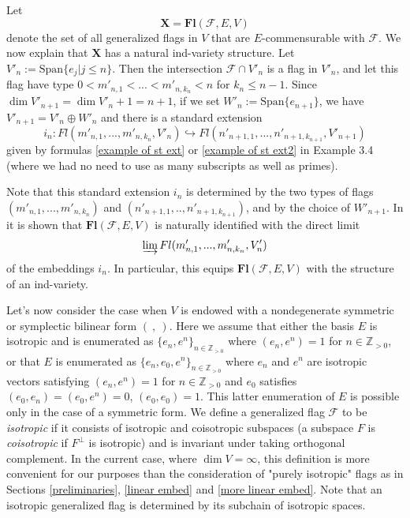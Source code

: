 \documentclass[12pt]{amsart}
\theoremstyle{definition}
\begin{document}
Let 
\begin{equation*}\label{X=F(...)}
\mathbf{X}=\mathbf{Fl}(\mathcal{F},E,V)
\end{equation*}
denote the set of all generalized flags in $V$ that are
$E$-commensurable 
with $\mathcal{F}$. We now explain that $\mathbf{X}$ 
has a natural ind-variety structure. Let $V'_n:=\mathrm{Span}
\{e_j|j\le n\}$. Then the intersection $\mathcal{F}\cap V'_n$ 
is a flag in $V'_n$, and let this flag have type $0<m'_{n,1}
<...<m'_{n,k_n}<n$ for $k_n\le n-1$. Since $\dim V'_{n+1}=\dim 
V'_n+1=n+1$, if we set $W'_n:=\mathrm{Span}\{e_{n+1}\}$,
we have $V'_{n+1}=V'_n\oplus W'_n$ and there is a standard
extension $$i_n:Fl(m'_{n,1},...,m'_{n,k_n},V'_n)\hookrightarrow
Fl(n'_{n+1,1},...,n'_{n+1,k_{n+1}},V'_{n+1})$$ given by 
formulas \eqref{example of st ext} or \eqref{example of st 
ext2} in Example 3.4 (where we had no need to use as many    
subscripts as well as primes).

Note that this standard extension $i_n$ is determined by the 
two types of flags $(m'_{n,1},...,m'_{n,k_n})$ and 
$(n'_{n+1,1},..,n'_{n+1,k_{n+1}})$, and by the choice of 
$W'_{n+1}$. In \cite{DP} it is shown that $\mathbf{Fl}(\mathcal{F},E,V)$ is 
naturally identified with the direct limit 
$$
\varinjlim Fl(m'_{n,1},...,m'_{n,k_n},V'_n)
$$ 
of the embeddings $i_n$. In particular, this equips 
$\mathbf{Fl}(\mathcal{F},E,V)$ with the structure of an 
ind-variety.

Let's now consider the case when $V$ is endowed with a 
nondegenerate symmetric or symplectic bilinear form $(\ ,\ )$. 
Here we assume that either the basis $E$ is isotropic and is 
enumerated as $\{e_n,e^n\}_{n\in\mathbb{Z}_{>0}}$ where 
$(e_n,e^n)=1$ for $n\in\mathbb{Z}_{>0}$, or that $E$ is 
enumerated as $\{e_n,e_0,e^n\}_{n\in\mathbb{Z}_{>0}}$ where 
$e_n$ and $e^n$ are isotropic vectors 
satisfying $(e_n,e^n)=1$ for $n\in\mathbb{Z}_{>0}$ and $e_0$
satisfies $(e_0,e_n)=(e_0,e^n)=0$, $(e_0,e_0)=1$. This latter
enumeration of $E$ is possible only in the case of a symmetric 
form. We define a generalized flag $\mathcal{F}$ to be 
\textit{isotropic} if it consists of isotropic and coisotropic 
subspaces (a subspace $F$ is \textit{coisotropic} if 
$F^{\bot}$ is isotropic) and is invariant under taking 
orthogonal complement. In the current case, where $\dim 
V=\infty$, this definition is more convenient for our purposes
than the consideration of "purely isotropic" flags as in 
Sections \ref{preliminaries}, \ref{linear embed} and \ref{more 
linear embed}. Note that an isotropic generalized flag is
determined by its subchain of isotropic spaces.
\end{document}
